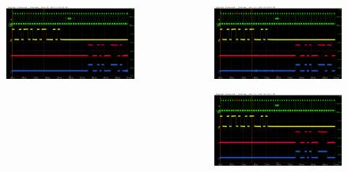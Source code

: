\documentclass[aspectratio=169]{beamer}
\begin{document}
\begin{frame}
\begin{columns}
\begin{center}
\begin{figure}
				\caption{}
			\end{figure}
			\begin{figure}
				\includegraphics[width=0.95 \textwidth]{IMG/probe/09-08-2021_ch05-read58-baselinedac1.png}
				\caption{}
			\end{figure}	
		\end{center}
		\begin{center}
			\begin{figure}
				\includegraphics[width=0.95 \textwidth]{IMG/probe/09-08-2021_ch05-read59-baselinedac1.png}
				\caption{}
			\end{figure}
			\begin{figure}
				\includegraphics[width=0.95 \textwidth]{IMG/probe/09-08-2021_ch05-read60-baselinedac1.png}
				\caption{}
			\end{figure}	
		\end{center}
	\end{columns}
		\end{frame}
	
\end{document}
